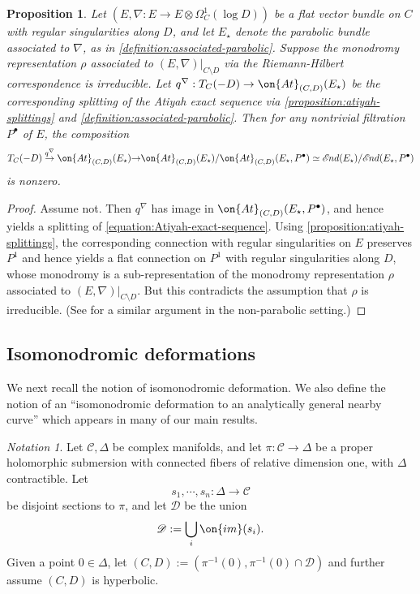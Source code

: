 \documentclass[12 pt]{amsart}
\theoremstyle{plain}
\newtheorem{proposition}[subsubsection]{Proposition}
\theoremstyle{definition}
\theoremstyle{remark}
\newtheorem{notation}[subsubsection]{Notation}
\numberwithin{equation}{section}
\newcommand*{\sheafend}{\mathscr{E}\kern -1pt nd}
\begin{document}
\begin{proposition}
	\label{proposition:irreduciblity-splitting-condition}
    Let $(E, \nabla: {E}\to {E}\otimes \Omega^1_C(\log D))$ be a flat
    vector bundle on $C$ with regular singularities along $D$, 
    and let $E_\star$ denote the parabolic bundle associated to $\nabla$, as in
    \autoref{definition:associated-parabolic}.
    Suppose the monodromy representation $\rho$ 
    associated to $(E, \nabla)|_{C\setminus D}$ via the Riemann-Hilbert
    correspondence is irreducible. Let $q^\nabla:
    T_C(-D)\to \on{At}_{(C,D)}(E_\star)$ be the corresponding splitting of the Atiyah
    exact sequence via \autoref{proposition:atiyah-splittings} and
    \autoref{definition:associated-parabolic}. Then for any
    nontrivial filtration $P^\bullet$ of $E$, the composition
    $$T_C(-D)\overset{q^\nabla}{\to} \on{At}_{(C,D)}(E_\star){\to}
    \on{At}_{(C,D)}(E_\star)/\on{At}_{(C,D)}(E_\star, P^\bullet)\simeq
    \sheafend(E_\star)/\sheafend(E_\star,P^\bullet)$$ is nonzero.
\end{proposition}
\begin{proof}
Assume not. Then $q^\nabla$ has image in $\on{At}_{(C,D)}(E_\star, P^\bullet)$, and
hence yields a splitting of \eqref{equation:Atiyah-exact-sequence}. 
Using \autoref{proposition:atiyah-splittings},
the corresponding connection with regular singularities on $E$ preserves $P^1$ and hence yields a flat connection on $P^1$ with regular singularities along
$D$, whose monodromy is a sub-representation of the monodromy representation
$\rho$ associated to $({E}, \nabla)|_{C\setminus D}$. 
But this contradicts the
assumption that $\rho$ is irreducible. (See \cite[Proof of Proposition
5.3]{BHH:logarithmic} for a similar argument in the non-parabolic setting.)
\end{proof}
\subsection{Isomonodromic deformations}
\label{subsection:isomonodromic-deformations}

We next recall the notion of  isomonodromic deformation.
We also define the notion of an ``isomonodromic deformation to an analytically
general nearby curve'' which appears in many of our main results.

\begin{notation}
	\label{notation:curve-and-sections}
	Let $\mathscr{C}, \Delta$ be complex manifolds, and let $\pi: \mathscr{C}\to \Delta$ 
be a proper holomorphic submersion with connected fibers of relative dimension
one, with $\Delta$ contractible.  Let $$s_1, \cdots, s_n: \Delta \to
\mathscr{C}$$ be disjoint sections to $\pi$, and let $\mathscr{D}$ be the union
$$\mathscr{D}:=\bigcup_i \on{im}(s_i).$$ Given a point $0\in \Delta$, let
$(C, D) := (\pi^{-1}(0), \pi^{-1}(0) \cap \mathscr D)$ and further assume
$(C, D)$ is hyperbolic.
\end{notation}
\end{document}
